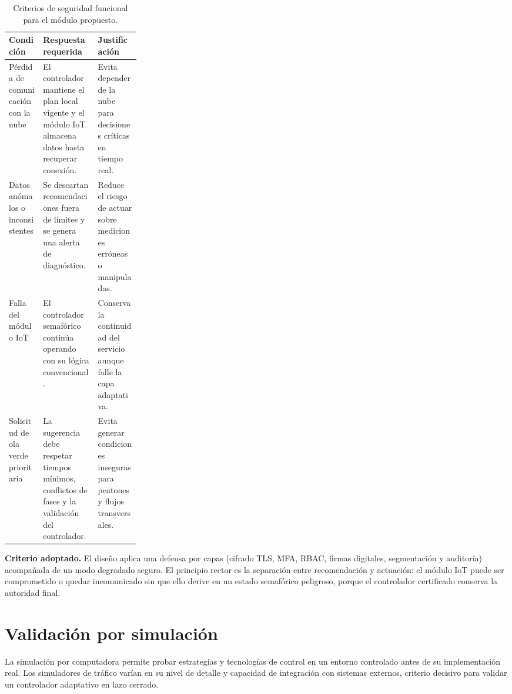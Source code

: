 \begin{table}[H]
  \centering
  \footnotesize
  \caption{Criterios de seguridad funcional para el módulo propuesto.}
  \label{tab:seg-funcional}
  \begin{tabularx}{\linewidth}{@{}>{\raggedright\arraybackslash}p{0.26\linewidth}XX@{}}
    \toprule
    \textbf{Condición} & \textbf{Respuesta requerida} & \textbf{Justificación} \\
    \midrule
    Pérdida de comunicación con la nube & El controlador mantiene el plan local vigente y el módulo IoT almacena datos hasta recuperar conexión. & Evita depender de la nube para decisiones críticas en tiempo real. \\
    Datos anómalos o inconsistentes & Se descartan recomendaciones fuera de límites y se genera una alerta de diagnóstico. & Reduce el riesgo de actuar sobre mediciones erróneas o manipuladas. \\
    Falla del módulo IoT & El controlador semafórico continúa operando con su lógica convencional. & Conserva la continuidad del servicio aunque falle la capa adaptativa. \\
    Solicitud de ola verde prioritaria & La sugerencia debe respetar tiempos mínimos, conflictos de fases y la validación del controlador. & Evita generar condiciones inseguras para peatones y flujos transversales. \\
    \bottomrule
  \end{tabularx}
\end{table}

\textbf{Criterio adoptado.} El diseño aplica una defensa por capas (cifrado TLS, MFA, RBAC, firmas digitales,
segmentación y auditoría) acompañada de un modo degradado seguro. El principio rector es la separación entre
recomendación y actuación: el módulo IoT puede ser comprometido o quedar incomunicado sin que ello derive en
un estado semafórico peligroso, porque el controlador certificado conserva la autoridad final.

\section{Validación por simulación}\label{sec:validacion}

La simulación por computadora permite probar estrategias y tecnologías de control en un entorno controlado
antes de su implementación real. Los simuladores de tráfico varían en su nivel de detalle y capacidad de
integración con sistemas externos, criterio decisivo para validar un controlador adaptativo en lazo cerrado.

